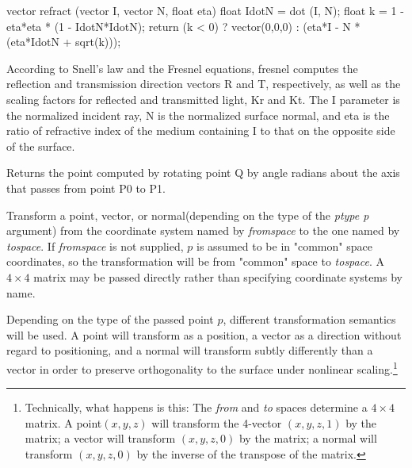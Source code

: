\documentclass[11pt,letterpaper]{book}
\def\normal{{\cf normal}\xspace}
\def\point{{\cf point}\xspace}
\def\vector{{\cf vector}\xspace}
\def\commonspace{{\cf "common"} space\xspace}
\begin{document}
\begin{code}
vector refract (vector I, vector N, float eta)
{
    float IdotN = dot (I, N);
    float k = 1 - eta*eta * (1 - IdotN*IdotN);
    return (k < 0) ? vector(0,0,0) : (eta*I - N * (eta*IdotN + sqrt(k)));
}
\end{code}
\apiend

According to Snell's law and the Fresnel equations, {\cf fresnel}
computes the reflection and transmission direction vectors {\cf R} and
{\cf T}, respectively, as well as the scaling factors for reflected
and transmitted light, {\cf Kr} and {\cf Kt}.  The {\cf I} parameter
is the normalized incident ray, {\cf N} is the normalized surface normal,
and {\cf eta} is the ratio of refractive index of the medium
containing {\cf I} to that on the opposite side of the surface.
\apiend

Returns the point computed by rotating point {\cf Q} by {\cf angle} 
radians about the axis that passes from point {\cf P0} to {\cf P1}.
\apiend


Transform a \point, \vector, or \normal (depending on the type of the
\emph{ptype p} argument) from the coordinate system named by
\emph{fromspace} to the one named by \emph{tospace}.  If 
\emph{fromspace} is not supplied, $p$ is assumed to be in \commonspace
coordinates, so the transformation will be from \commonspace to
\emph{tospace}.  A $4 \times 4$ matrix may be passed directly rather
than specifying coordinate systems by name.

Depending on the type of the passed point $p$, different transformation
semantics will be used.  A \point will transform as a position, a
\vector as a direction without regard to positioning, and a \normal will
transform subtly differently than a \vector in order to preserve
orthogonality to the surface under nonlinear
scaling.\footnote{Technically, what happens is this: The \emph{from} and
  \emph{to} spaces determine a $4 \times 4$ matrix.  A \point $(x,y,z)$
  will transform the 4-vector $(x,y,z,1)$ by the matrix; a \vector will
  transform $(x,y,z,0)$ by the matrix; a \normal will transform
  $(x,y,z,0)$ by the inverse of the transpose of the matrix.}
\end{document}
